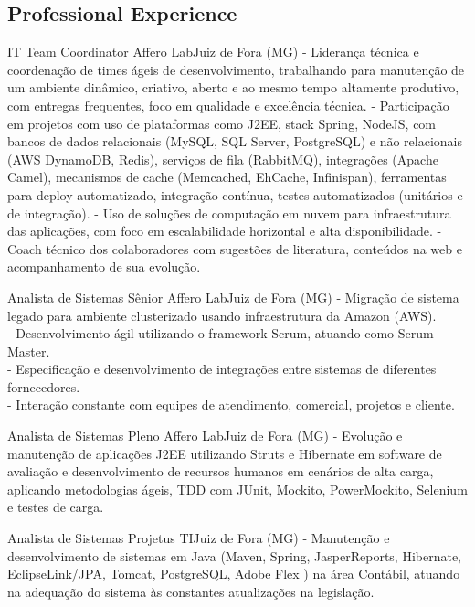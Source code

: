 \documentclass[12pt, a4paper, sans]{moderncv}
\begin{document}
\makecvtitle


%
%
\subsection{Professional Experience}
{IT Team Coordinator}
{Affero Lab}{Juiz de Fora (MG)}{}
{
- Liderança técnica e coordenação de times ágeis de desenvolvimento, trabalhando para manutenção de um ambiente dinâmico, criativo, aberto e ao mesmo tempo altamente produtivo, com entregas frequentes, foco em qualidade e excelência técnica.\newline{}
- Participação em projetos com uso de plataformas como J2EE, stack Spring, NodeJS, com bancos de dados relacionais (MySQL, SQL Server, PostgreSQL) e não relacionais (AWS DynamoDB, Redis), serviços de fila (RabbitMQ), integrações (Apache Camel), mecanismos de cache (Memcached, EhCache, Infinispan), ferramentas para deploy automatizado, integração contínua, testes automatizados (unitários e de integração).\newline{}
- Uso de soluções de computação em nuvem para infraestrutura das aplicações, com foco em escalabilidade horizontal e alta disponibilidade.\newline{}
- Coach técnico dos colaboradores com sugestões de literatura, conteúdos na web e acompanhamento de sua evolução.}

{Analista de Sistemas Sênior}
{Affero Lab}{Juiz de Fora (MG)}{}
{- Migração de sistema legado para ambiente clusterizado usando infraestrutura da Amazon (AWS).\\
- Desenvolvimento ágil utilizando o framework Scrum, atuando como Scrum Master.\\
- Especificação e desenvolvimento de integrações entre sistemas de diferentes fornecedores.\\
- Interação constante com equipes de atendimento, comercial, projetos e cliente.}

{Analista de Sistemas Pleno}
{Affero Lab}{Juiz de Fora (MG)}{}
{- Evolução e manutenção de aplicações J2EE utilizando Struts e Hibernate em software de avaliação e desenvolvimento de recursos humanos em cenários de alta carga, aplicando metodologias ágeis, TDD com JUnit, Mockito, PowerMockito, Selenium e testes de carga.}

{Analista de Sistemas}
{Projetus TI}{Juiz de Fora (MG)}{}
{- Manutenção e desenvolvimento de sistemas em Java (Maven, Spring, JasperReports, Hibernate, EclipseLink/JPA, Tomcat, PostgreSQL, Adobe Flex ) na área Contábil, atuando na adequação do sistema às constantes atualizações na legislação.}
\end{document}
